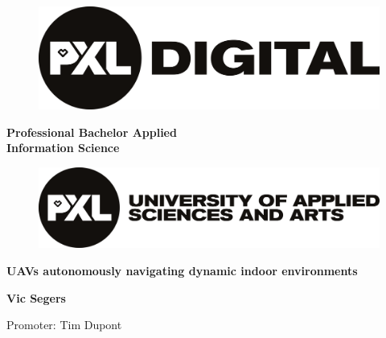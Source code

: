 \begin{titlepage}
  \thispagestyle{titlepage}
  \color{pxlgreen}
  \begin{figure}
    \centering
    \includegraphics[width=0.5\linewidth]{images/logo_pxl_digital.png}
  \end{figure}
  \vspace{\baselineskip}
  \begin{center}
    \LARGE\textbf{Professional Bachelor Applied\\ Information Science}
  \end{center}
  \vspace{\baselineskip}
  \begin{figure}[h]
    \centering
    \includegraphics[width=0.7\linewidth]{images/logo_PXL_University_of_applied_sciences_and_arts.png}
  \end{figure}
  \begin{center}
    \Huge\textbf{UAVs autonomously navigating dynamic indoor environments}
  \end{center}
  \vspace{\baselineskip}
  \begin{center}
    \Large\textbf{Vic Segers}
  \end{center}
  \vspace{\baselineskip}
  \begin{center}
    \large{Promoter: Tim Dupont}
  \end{center}
\end{titlepage}